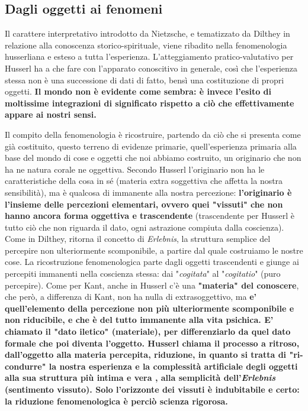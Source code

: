 \subsection{Dagli oggetti ai fenomeni}


Il carattere interpretativo introdotto da Nietzsche,
e tematizzato da Dilthey in relazione
alla conoscenza storico-spirituale, viene
ribadito nella fenomenologia husserliana e
esteso a tutta l'esperienza.
L'atteggiamento pratico-valutativo per Husserl
ha a che fare con l'apparato conoscitivo in
generale, così che l'esperienza stessa non è
una successione di dati di fatto, bensì una
costituzione di propri oggetti.
\textbf{Il mondo non è evidente come sembra: è invece
l'esito di moltissime integrazioni di significato
rispetto a ciò che effettivamente appare ai
nostri sensi.}

 Il compito della fenomenologia è
ricostruire, partendo da ciò che si presenta come
già costituito, questo terreno di evidenze
primarie, quell'esperienza primaria alla base
del mondo di cose e oggetti che noi abbiamo
costruito, un originario che non ha ne natura
corale ne oggettiva.
Secondo Husserl l'originario non ha le caratteristiche
della cosa in sé (materia extra soggettiva che
affetta la nostra sensibilità), ma è qualcosa
di immanente alla nostra percezione: \textbf{l'originario
è l'insieme delle percezioni elementari, ovvero quei
"vissuti" che non hanno ancora forma oggettiva e
trascendente} (trascendente per Husserl è tutto ciò che non riguarda il dato, ogni astrazione compiuta dalla coscienza).
Come in Dilthey, ritorna il concetto di \textit{Erlebnis},
la struttura semplice del percepire non ulteriormente scomponibile, a partire dal quale costruiamo
le nostre cose. La ricostruzione fenomenologica
parte dagli oggetti trascendenti e giunge
ai percepiti immanenti nella coscienza stessa:
dai "\textit{cogitata}" al "\textit{cogitatio}" (puro percepire).
Come per Kant, anche in Husserl c'è una
\textbf{"materia" del conoscere}, che però, a differenza di
Kant, non ha nulla di extrasoggettivo, ma \textbf{e' quell'elemento della percezione non più ulteriormente
scomponibile e non riducibile, e che è del
tutto immanente alla vita psichica. E'
chiamato il "dato iletico" (materiale), per
differenziarlo da quel dato formale che poi diventa l'oggetto.
Husserl chiama il processo a ritroso, dall'oggetto alla materia percepita, riduzione,
in quanto si tratta di "ri-condurre" la
nostra esperienza e la complessità artificiale
degli oggetti alla sua struttura più intima
e vera , alla semplicità dell'\textit{Erlebnis}
(sentimento vissuto).
Solo l'orizzonte dei vissuti è indubitabile e
certo: la riduzione fenomenologica è
perciò scienza rigorosa.}


